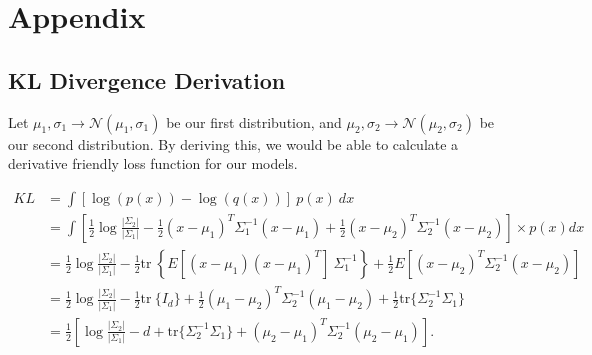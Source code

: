 \documentclass[12pt,twoside]{report}
\begin{document}
\chapter{Appendix}

\section{KL Divergence Derivation}
\label{kl_derivation}
Let $\mu_1, \sigma_1 \rightarrow \mathcal{N}(\mu_1,\sigma_1)$ be our first distribution, and $\mu_2, \sigma_2 \rightarrow \mathcal{N}(\mu_2,\sigma_2)$ be our second distribution. By deriving this, we would be able to calculate a derivative friendly loss function for our models.

\begin{equation}
	\label{eq:t}
	\begin{aligned}
	KL &= \int \left[\log( p(x)) - \log( q(x)) \right]\ p(x)\ dx \\
	&= \int \left[ \frac{1}{2} \log\frac{|\Sigma_2|}{|\Sigma_1|} - \frac{1}{2} (x-\mu_1)^T\Sigma_1^{-1}(x-\mu_1) + \frac{1}{2} (x-\mu_2)^T\Sigma_2^{-1}(x-\mu_2) \right] \times p(x) dx \\
	&= \frac{1}{2} \log\frac{|\Sigma_2|}{|\Sigma_1|} - \frac{1}{2} \text{tr}\ \left\{E[(x - \mu_1)(x - \mu_1)^T] \ \Sigma_1^{-1} \right\} + \frac{1}{2} E[(x - \mu_2)^T \Sigma_2^{-1} (x - \mu_2)] \\
	&= \frac{1}{2} \log\frac{|\Sigma_2|}{|\Sigma_1|} - \frac{1}{2} \text{tr}\ \{I_d \} + \frac{1}{2} (\mu_1 - \mu_2)^T \Sigma_2^{-1} (\mu_1 - \mu_2) + \frac{1}{2} \text{tr} \{ \Sigma_2^{-1} \Sigma_1 \} \\
	&= \frac{1}{2}\left[\log\frac{|\Sigma_2|}{|\Sigma_1|} - d + \text{tr} \{ \Sigma_2^{-1}\Sigma_1 \} + (\mu_2 - \mu_1)^T \Sigma_2^{-1}(\mu_2 - \mu_1)\right].
\end{aligned}
\end{equation}
\end{document}
